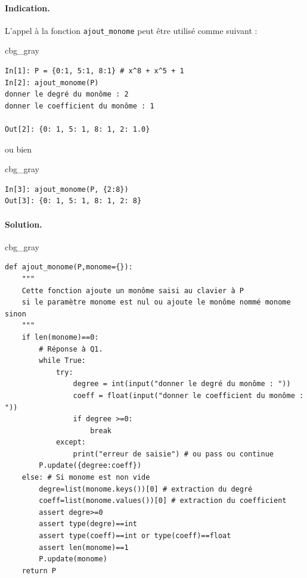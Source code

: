 \documentclass[%
oneside,                 %
final,                   %
10pt,french]{article}
\newenvironment{_cod_tight}[1]{
   \def\FrameCommand{\colorbox{#1}}
   \FrameRule0.6pt\MakeFramed {\FrameRestore}\vskip3mm}
   {\vskip0mm\endMakeFramed}
\newenvironment{cod}[1]{
\bgroup\rmfamily
\fboxsep=0mm\relax
\begin{_cod_tight}{#1}
\list{}{\parsep=-2mm\parskip=0mm\topsep=0pt\leftmargin=2mm
\rightmargin=2\leftmargin\leftmargin=4pt\relax}
\item\relax}
{\endlist\end{_cod_tight}\egroup}
\newenvironment{doconceexercise}{}{}
\begin{document}
\begin{doconceexercise}

\paragraph{Indication.}
L'appel à la fonction \Verb!ajout_monome! peut être utilisé comme suivant :
\begin{cod}{cbg_gray}\begin{verbatim}
In[1]: P = {0:1, 5:1, 8:1} # x^8 + x^5 + 1
In[2]: ajout_monome(P)
donner le degré du monôme : 2
donner le coefficient du monôme : 1

Out[2]: {0: 1, 5: 1, 8: 1, 2: 1.0}
\end{verbatim}
\end{cod}
\noindent
ou bien
\begin{cod}{cbg_gray}\begin{verbatim}
In[3]: ajout_monome(P, {2:8})
Out[3]: {0: 1, 5: 1, 8: 1, 2: 8}
\end{verbatim}
\end{cod}
\noindent



\paragraph{Solution.}
\begin{cod}{cbg_gray}\begin{verbatim}
def ajout_monome(P,monome={}):
    """
    Cette fonction ajoute un monôme saisi au clavier à P
    si le paramètre monome est nul ou ajoute le monôme nommé monome sinon
    """
    if len(monome)==0:
        # Réponse à Q1.
        while True:
            try:
                degree = int(input("donner le degré du monôme : "))
                coeff = float(input("donner le coefficient du monôme : "))
                if degree >=0:
                    break
            except:
                print("erreur de saisie") # ou pass ou continue
        P.update({degree:coeff})
    else: # Si monome est non vide
        degre=list(monome.keys())[0] # extraction du degré
        coeff=list(monome.values())[0] # extraction du coefficient
        assert degre>=0
        assert type(degre)==int
        assert type(coeff)==int or type(coeff)==float
        assert len(monome)==1
        P.update(monome)
    return P
\end{verbatim}
\end{cod}
\noindent


\end{doconceexercise}
\end{document}

